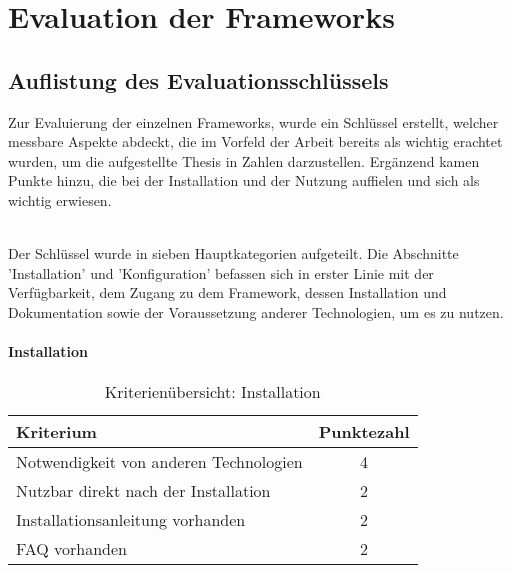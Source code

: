 \chapter{Evaluation der Frameworks}
\section{Auflistung des Evaluationsschlüssels}

Zur Evaluierung der einzelnen Frameworks, wurde ein Schlüssel erstellt, welcher messbare Aspekte abdeckt, die im Vorfeld der Arbeit bereits als wichtig erachtet wurden, um die aufgestellte Thesis in Zahlen darzustellen. Ergänzend kamen Punkte hinzu, die bei der Installation und der Nutzung auffielen und sich als wichtig erwiesen. 

\\Der Schlüssel wurde in sieben Hauptkategorien aufgeteilt. Die Abschnitte 'Installation' und 'Konfiguration' befassen sich in erster Linie mit der Verfügbarkeit, dem Zugang zu dem Framework, dessen Installation und Dokumentation sowie der Voraussetzung anderer Technologien, um es zu nutzen.

\subsubsection{Installation}
\begin{table}[H]
 	\vspace{-30pt}
 	\centering
		\begin{tabular}{| p{12cm} | c|}
			\hline
				Kriterium		 &	Punktezahl\\
			\hline
			\hline
				Notwendigkeit von anderen Technologien				&4\\
				Nutzbar direkt nach der Installation			&	2	\\
				Installationsanleitung vorhanden			&	2	\\
				FAQ vorhanden				&	2	\\
				\hline
		\end{tabular}
	\caption{Kriterienübersicht: Installation}
\end{table}

